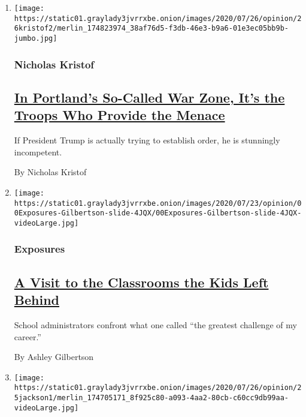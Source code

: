 \begin{enumerate}
\def\labelenumi{\arabic{enumi}.}
\item
  \texttt{[image: https://static01.graylady3jvrrxbe.onion/images/2020/07/26/opinion/26kristof2/merlin\_174823974\_38af76d5-f3db-46e3-b9a6-01e3ec05bb9b-jumbo.jpg]}

  \hypertarget{nicholas-kristof}{%
  \subsubsection{Nicholas Kristof}\label{nicholas-kristof}}

  \hypertarget{in-portlands-so-called-war-zone-its-the-troops-who-provide-the-menace}{%
  \subsection{\texorpdfstring{\href{/2020/07/25/opinion/sunday/portland-protest-federal-troops.html}{In
  Portland's So-Called War Zone, It's the Troops Who Provide the
  Menace}}{In Portland's So-Called War Zone, It's the Troops Who Provide the Menace}}\label{in-portlands-so-called-war-zone-its-the-troops-who-provide-the-menace}}

  If President Trump is actually trying to establish order, he is
  stunningly incompetent.

  By Nicholas Kristof
\item
  \texttt{[image: https://static01.graylady3jvrrxbe.onion/images/2020/07/23/opinion/00Exposures-Gilbertson-slide-4JQX/00Exposures-Gilbertson-slide-4JQX-videoLarge.jpg]}

  \hypertarget{exposures}{%
  \subsubsection{Exposures}\label{exposures}}

  \hypertarget{a-visit-to-the-classrooms-the-kids-left-behind}{%
  \subsection{\texorpdfstring{\href{/2020/07/25/opinion/school-coronavirus-reopening.html}{A
  Visit to the Classrooms the Kids Left
  Behind}}{A Visit to the Classrooms the Kids Left Behind}}\label{a-visit-to-the-classrooms-the-kids-left-behind}}

  School administrators confront what one called ``the greatest
  challenge of my career.''

  By Ashley Gilbertson
\item
  \texttt{[image: https://static01.graylady3jvrrxbe.onion/images/2020/07/26/opinion/25jackson1/merlin\_174705171\_8f925c80-a093-4aa2-80cb-c60cc9db99aa-videoLarge.jpg]}


\end{enumerate}
